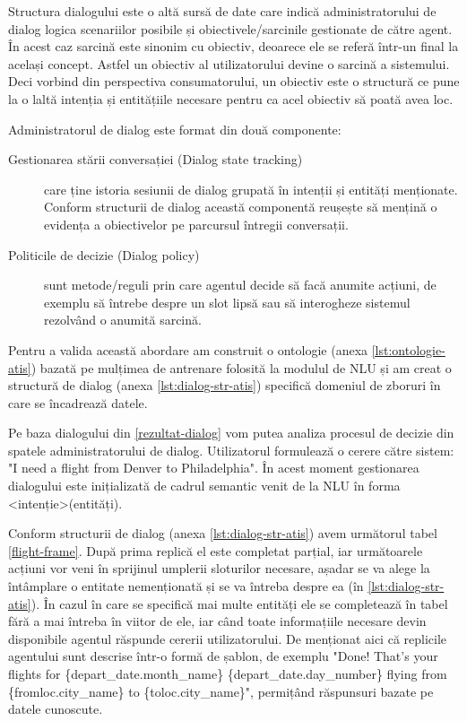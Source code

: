 Structura dialogului este o altă sursă de date care indică administratorului de dialog logica scenariilor posibile și obiectivele/sarcinile gestionate de către agent. În acest caz sarcină este sinonim cu obiectiv, deoarece ele se referă într-un final la același concept. Astfel un obiectiv al utilizatorului devine o sarcină a sistemului. Deci vorbind din perspectiva consumatorului, un obiectiv este o structură ce pune la o laltă intenția și entitățiile necesare pentru ca acel obiectiv să poată avea loc.

Administratorul de dialog este format din două componente: 
\begin{description}
	\item[Gestionarea stării conversației (Dialog state tracking)] care ține istoria sesiunii de dialog grupată în intenții și entități menționate. Conform structurii de dialog această componentă reușește să mențină o evidența a obiectivelor pe parcursul întregii conversații.
	\item[Politicile de decizie (Dialog policy)] sunt metode/reguli prin care agentul decide să facă anumite acțiuni, de exemplu să întrebe despre un slot lipsă sau să interogheze sistemul rezolvând o anumită sarcină.
\end{description}

Pentru a valida această abordare am construit o ontologie (anexa \ref{lst:ontologie-atis}) bazată pe mulțimea de antrenare folosită la modulul de NLU și am creat o structură de dialog (anexa \ref{lst:dialog-str-atis}) specifică domeniul de zboruri în care se încadrează datele.

Pe baza dialogului din \ref{rezultat-dialog} vom putea analiza procesul de decizie din spatele administratorului de dialog.
Utilizatorul formulează o cerere către sistem: "I need a flight from Denver to Philadelphia". În acest moment gestionarea dialogului este inițializată de cadrul semantic venit de la NLU în forma <intenție>(entități).

Conform structurii de dialog (anexa \ref{lst:dialog-str-atis}) avem următorul tabel \ref{flight-frame}. După prima replică el este completat parțial, iar următoarele acțiuni vor veni în sprijinul umplerii sloturilor necesare, așadar se va alege la întâmplare o entitate nemenționată și se va întreba despre ea (în \ref{lst:dialog-str-atis}). În cazul în care se specifică mai multe entități ele se completează în tabel fără a mai întreba în viitor de ele, iar când toate informațiile necesare devin disponibile agentul răspunde cererii utilizatorului. De menționat aici că replicile agentului sunt descrise într-o formă de șablon, de exemplu {\ttfamily "Done! That's your flights for \{depart\_date.month\_name\} \{depart\_date.day\_number\} flying from \newline \{fromloc.city\_name\} to \{toloc.city\_name\}"}, permițând răspunsuri bazate pe datele cunoscute.

